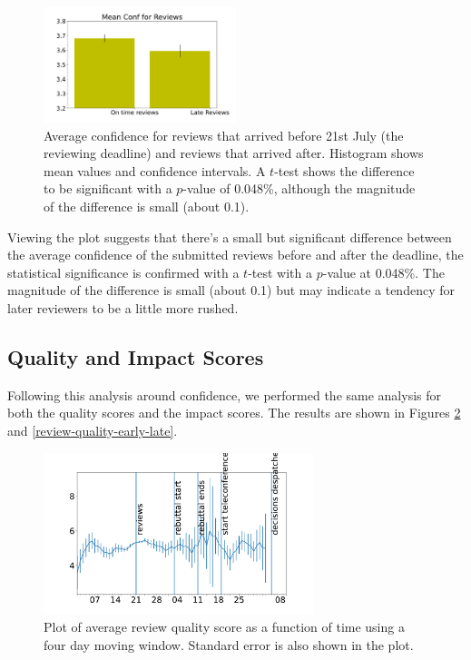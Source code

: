 \begin{figure}[htb]
\centering
\includegraphics[width=0.50\textwidth]{diagrams/neurips/review-confidence-early-late.pdf}

\caption{Average confidence for reviews that arrived
before 21st July (the reviewing deadline) and reviews that arrived
after. Histogram shows mean values and confidence intervals. A
\(t\)-test shows the difference to be significant with a \(p\)-value of
0.048\%, although the magnitude of the difference is small (about
0.1).} \label{review-confidence-early-late}
\end{figure}

Viewing the plot suggests that there's a small but significant difference between
the average confidence of the submitted reviews before and after the
deadline, the statistical significance is confirmed with a \(t\)-test
with a \(p\)-value at 0.048\%. The magnitude of the difference is small
(about 0.1) but may indicate a tendency for later reviewers to be a
little more rushed.

\subsection{Quality and Impact Scores}\label{quality-score}

Following this analysis around confidence, we performed the same analysis for both the quality scores and the impact scores. The results are shown in Figures
\ref{review-quality-time} and \ref{review-quality-early-late}.

\begin{figure}[htb]
\centering
\includegraphics[width=0.70\textwidth]{diagrams/neurips/review-quality-time.pdf}

\caption{Plot of average review quality score as a function of time using a four day moving window. Standard error is also shown in the plot.}
\label{review-quality-time}
\end{figure}

